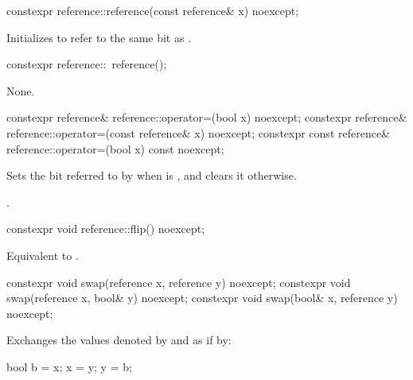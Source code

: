 %
\begin{itemdecl}
constexpr reference::reference(const reference& x) noexcept;
\end{itemdecl}

\begin{itemdescr}
\pnum
\effects
Initializes  to refer to the same bit as .
\end{itemdescr}

%
\begin{itemdecl}
constexpr reference::~reference();
\end{itemdecl}

\begin{itemdescr}
\pnum
\effects
None.
\end{itemdescr}

%
\begin{itemdecl}
constexpr reference& reference::operator=(bool x) noexcept;
constexpr reference& reference::operator=(const reference& x) noexcept;
constexpr const reference& reference::operator=(bool x) const noexcept;
\end{itemdecl}

\begin{itemdescr}
\pnum
\effects
Sets the bit referred to by  when  is ,
and clears it otherwise.

\pnum
\returns
{}.
\end{itemdescr}

%
\begin{itemdecl}
constexpr void reference::flip() noexcept;
\end{itemdecl}

\begin{itemdescr}
\pnum
\effects
Equivalent to .
\end{itemdescr}

%
\begin{itemdecl}
constexpr void swap(reference x, reference y) noexcept;
constexpr void swap(reference x, bool& y) noexcept;
constexpr void swap(bool& x, reference y) noexcept;
\end{itemdecl}

\begin{itemdescr}
\pnum
\effects
Exchanges the values denoted by  and  as if by:

\begin{codeblock}
bool b = x;
x = y;
y = b;
\end{codeblock}
\end{itemdescr}



